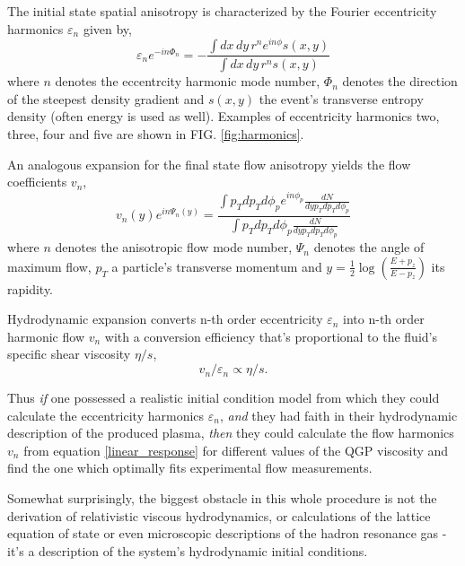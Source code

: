\documentclass[aps,prc,reprint,amsmath,nofootinbib]{revtex4-1}
\begin{document}
The initial state spatial anisotropy is characterized by the Fourier eccentricity harmonics $\varepsilon_n$ given by,
\begin{equation}
 \varepsilon_n e^{-i n \Phi_n} = -\frac{\int dx\,dy\,r^n e^{i n \phi} s(x,y)}{\int dx\,dy\, r^n s(x,y)}
\end{equation}
where $n$ denotes the eccentrcity harmonic mode number, $\Phi_n$ denotes the direction of the steepest density gradient and $s(x,y)$ the event's transverse entropy density
(often energy is used as well). Examples of eccentricity harmonics two, three, four and five are shown in FIG. \ref{fig:harmonics}.

An analogous expansion for the final state flow anisotropy yields the flow coefficients $v_n$,
\begin{equation}
 v_n(y) e^{i n \Psi_n(y)} = \frac{\int p_T dp_T d\phi_p e^{i n \phi_p} \frac{dN}{dy p_T dp_T d\phi_p}}{\int p_T dp_T d\phi_p \frac{dN}{dy p_T dp_T d\phi_p}}
\end{equation}
where $n$ denotes the anisotropic flow mode number, $\Psi_n$ denotes the angle of maximum flow, $p_T$ a particle's transverse momentum and 
$y=\tfrac{1}{2}\log(\tfrac{E+p_z}{E-p_z})$ its rapidity.

Hydrodynamic expansion converts n-th order eccentricity $\varepsilon_n$ into n-th order harmonic flow $v_n$ with a conversion efficiency that's proportional to the fluid's
specific shear viscosity $\eta/s$,
\begin{equation}
 \label{linear_response}
 v_n/\varepsilon_n \propto \eta/s.
\end{equation}

Thus \emph{if} one possessed a realistic initial condition model from which they could calculate the eccentricity harmonics $\varepsilon_n$, \emph{and} they had faith 
in their hydrodynamic description of the produced plasma, \emph{then} they could calculate the flow harmonics $v_n$ from equation \ref{linear_response} for different values 
of the QGP viscosity and find the one which optimally fits experimental flow measurements.

Somewhat surprisingly, the biggest obstacle in this whole procedure is not the derivation of relativistic viscous hydrodynamics, or calculations of the lattice equation
of state or even microscopic descriptions of the hadron resonance gas - it's a description of the system's hydrodynamic initial conditions. 
\end{document}
